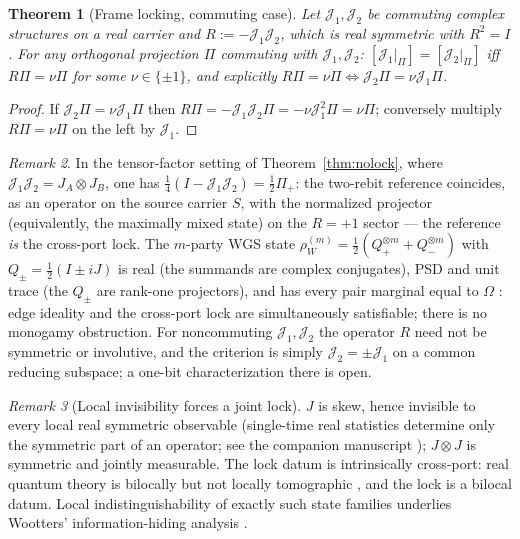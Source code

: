 \documentclass[11pt]{article}
\theoremstyle{plain}
\newtheorem{theorem}{Theorem}[section]
\theoremstyle{definition}
\theoremstyle{remark}
\newtheorem{remark}[theorem]{Remark}
\theoremstyle{plain}
\newcommand{\Om}{\Omega}
\newcommand{\cJ}{\mathcal{J}}
\begin{document}
\begin{theorem}[Frame locking, commuting case]\label{thm:lock}
Let $\cJ_1,\cJ_2$ be commuting complex structures on a real
carrier and $R := -\cJ_1\cJ_2$, which is real symmetric with
$R^2 = I$. For any orthogonal projection $\Pi$ commuting with
$\cJ_1,\cJ_2$: $[\cJ_1|_\Pi] = [\cJ_2|_\Pi]$ iff
$R\Pi = \nu\Pi$ for some $\nu\in\{\pm1\}$, and explicitly
$R\Pi = \nu\Pi \iff \cJ_2\Pi = \nu\cJ_1\Pi$.
\end{theorem}

\begin{proof}
If $\cJ_2\Pi = \nu\cJ_1\Pi$ then
$R\Pi = -\cJ_1\cJ_2\Pi = -\nu\cJ_1^2\Pi = \nu\Pi$; conversely
multiply $R\Pi = \nu\Pi$ on the left by $\cJ_1$.
\end{proof}

\begin{remark}\label{rem:lockstate}
In the tensor-factor setting of Theorem~\ref{thm:nolock}, where
$\cJ_1\cJ_2 = J_A\otimes J_B$, one has
$\tfrac14(I - \cJ_1\cJ_2) = \tfrac12\Pi_+$: the two-rebit
reference coincides, as an operator on the source carrier $S$,
with the normalized projector (equivalently, the maximally
mixed state) on the $R = +1$ sector --- the reference \emph{is}
the cross-port lock. The $m$-party WGS state
$\rho^{(m)}_W = \tfrac12(Q_+^{\otimes m} + Q_-^{\otimes m})$ with
$Q_\pm = \tfrac12(I\pm iJ)$ is real (the summands are complex
conjugates), PSD and unit trace (the $Q_\pm$ are rank-one
projectors), and has every pair marginal equal to $\Om$
\cite{wgs2025}: edge ideality and the cross-port lock are
simultaneously satisfiable; there is no monogamy obstruction. For
noncommuting $\cJ_1,\cJ_2$ the operator $R$ need not be symmetric
or involutive, and the criterion is simply $\cJ_2 = \pm\cJ_1$ on a
common reducing subspace; a one-bit characterization there is
open.
\end{remark}

\begin{remark}[Local invisibility forces a joint lock]
\label{rem:joint}
$J$ is skew, hence invisible to every local real symmetric
observable (single-time real statistics determine only the
symmetric part of an operator; see the companion manuscript
\cite{companion}); $J\otimes J$ is symmetric and jointly
measurable. The lock datum is intrinsically cross-port: real
quantum theory is bilocally but not locally tomographic
\cite{hardy2012}, and the lock is a bilocal datum. Local
indistinguishability of exactly such state families underlies
Wootters' information-hiding analysis \cite{wootters2012}.
\end{remark}
\end{document}
